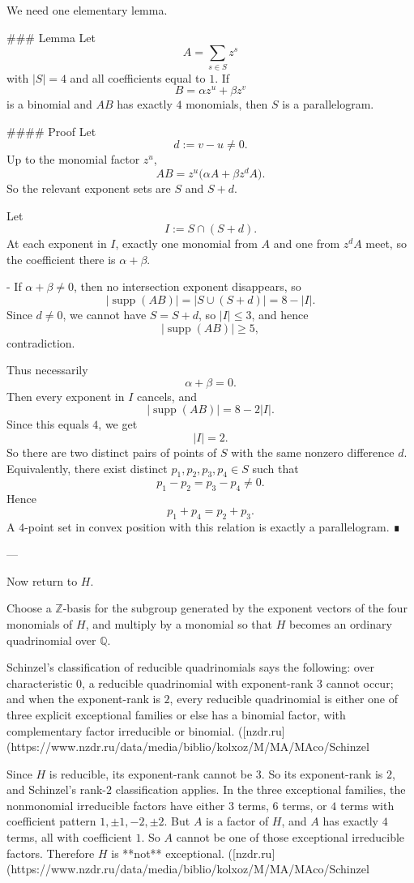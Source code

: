 We need one elementary lemma.

### Lemma
Let
\[
A=\sum_{s\in S} z^s
\]
with \(|S|=4\) and all coefficients equal to \(1\). If
\[
B=\alpha z^u+\beta z^v
\]
is a binomial and \(AB\) has exactly \(4\) monomials, then \(S\) is a parallelogram.

#### Proof
Let
\[
d:=v-u\neq 0.
\]
Up to the monomial factor \(z^u\),
\[
AB=z^u\bigl(\alpha A+\beta z^dA\bigr).
\]
So the relevant exponent sets are \(S\) and \(S+d\).

Let
\[
I:=S\cap (S+d).
\]
At each exponent in \(I\), exactly one monomial from \(A\) and one from \(z^dA\) meet, so the coefficient there is \(\alpha+\beta\).

- If \(\alpha+\beta\neq 0\), then no intersection exponent disappears, so
  \[
  |\operatorname{supp}(AB)|=|S\cup (S+d)|=8-|I|.
  \]
  Since \(d\neq 0\), we cannot have \(S=S+d\), so \(|I|\le 3\), and hence
  \[
  |\operatorname{supp}(AB)|\ge 5,
  \]
  contradiction.

Thus necessarily
\[
\alpha+\beta=0.
\]
Then every exponent in \(I\) cancels, and
\[
|\operatorname{supp}(AB)|=8-2|I|.
\]
Since this equals \(4\), we get
\[
|I|=2.
\]
So there are two distinct pairs of points of \(S\) with the same nonzero difference \(d\). Equivalently, there exist distinct \(p_1,p_2,p_3,p_4\in S\) such that
\[
p_1-p_2=p_3-p_4\neq 0.
\]
Hence
\[
p_1+p_4=p_2+p_3.
\]
A \(4\)-point set in convex position with this relation is exactly a parallelogram. ∎

---

Now return to \(H\).

Choose a \(\mathbb Z\)-basis for the subgroup generated by the exponent vectors of the four monomials of \(H\), and multiply by a monomial so that \(H\) becomes an ordinary quadrinomial over \(\mathbb Q\).

Schinzel's classification of reducible quadrinomials says the following: over characteristic \(0\), a reducible quadrinomial with exponent-rank \(3\) cannot occur; and when the exponent-rank is \(2\), every reducible quadrinomial is either one of three explicit exceptional families or else has a binomial factor, with complementary factor irreducible or binomial. ([nzdr.ru](https://www.nzdr.ru/data/media/biblio/kolxoz/M/MA/MAco/Schinzel%

Since \(H\) is reducible, its exponent-rank cannot be \(3\). So its exponent-rank is \(2\), and Schinzel's rank-\(2\) classification applies. In the three exceptional families, the nonmonomial irreducible factors have either \(3\) terms, \(6\) terms, or \(4\) terms with coefficient pattern \(1,\pm1,-2,\pm2\). But \(A\) is a factor of \(H\), and \(A\) has exactly \(4\) terms, all with coefficient \(1\). So \(A\) cannot be one of those exceptional irreducible factors. Therefore \(H\) is **not** exceptional. ([nzdr.ru](https://www.nzdr.ru/data/media/biblio/kolxoz/M/MA/MAco/Schinzel%

